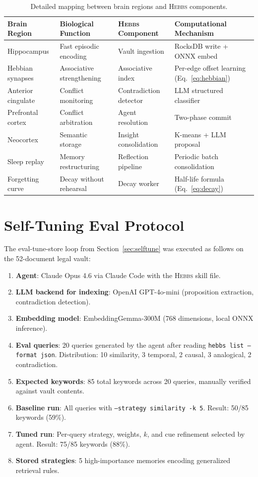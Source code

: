 \documentclass{article}
\begin{document}
\begin{table}[h]
\centering
\caption{Detailed mapping between brain regions and \textsc{Hebbs} components.}
\small
\begin{tabular}{@{}llll@{}}
\toprule
\textbf{Brain Region} & \textbf{Biological Function} & \textbf{\textsc{Hebbs} Component} & \textbf{Computational Mechanism} \\
\midrule
Hippocampus & Fast episodic encoding & Vault ingestion & RocksDB write + ONNX embed \\
Hebbian synapses & Associative strengthening & Associative index & Per-edge offset learning (Eq.~\ref{eq:hebbian}) \\
Anterior cingulate & Conflict monitoring & Contradiction detector & LLM structured classifier \\
Prefrontal cortex & Conflict arbitration & Agent resolution & Two-phase commit \\
Neocortex & Semantic storage & Insight consolidation & K-means + LLM proposal \\
Sleep replay & Memory restructuring & Reflection pipeline & Periodic batch consolidation \\
Forgetting curve & Decay without rehearsal & Decay worker & Half-life formula (Eq.~\ref{eq:decay}) \\
\bottomrule
\end{tabular}
\end{table}

\section{Self-Tuning Eval Protocol}
\label{app:tuning}

The eval-tune-store loop from Section~\ref{sec:selftune} was executed as follows on the 52-document legal vault:

\begin{enumerate}
    \item \textbf{Agent}: Claude Opus 4.6 via Claude Code with the \textsc{Hebbs} skill file.
    \item \textbf{LLM backend for indexing}: OpenAI GPT-4o-mini (proposition extraction, contradiction detection).
    \item \textbf{Embedding model}: EmbeddingGemma-300M (768 dimensions, local ONNX inference).
    \item \textbf{Eval queries}: 20 queries generated by the agent after reading \texttt{hebbs list --format json}. Distribution: 10 similarity, 3 temporal, 2 causal, 3 analogical, 2 contradiction.
    \item \textbf{Expected keywords}: 85 total keywords across 20 queries, manually verified against vault contents.
    \item \textbf{Baseline run}: All queries with \texttt{--strategy similarity -k 5}. Result: 50/85 keywords (59\%).
    \item \textbf{Tuned run}: Per-query strategy, weights, $k$, and cue refinement selected by agent. Result: 75/85 keywords (88\%).
    \item \textbf{Stored strategies}: 5 high-importance memories encoding generalized retrieval rules.
\end{enumerate}
\end{document}
